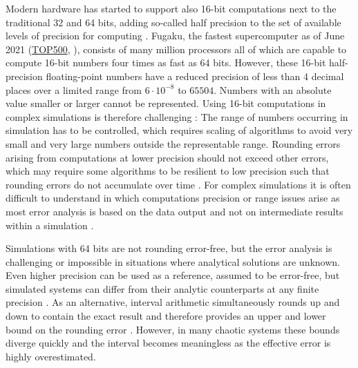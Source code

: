 Modern hardware has started to support also 16-bit computations next to the traditional 32 and 64 bits,
adding so-called half precision to the set of available levels of precision for computing \citep{Jouppi2018,Odajima2020}.
Fugaku, the fastest supercomputer as of June 2021 (\href{https://top500.org}{TOP500}, \cite{Dongarra2011}), consists
of many million processors all of which are capable to compute 16-bit numbers four times as fast as 64 bits. However, these 
16-bit half-precision floating-point numbers have a reduced precision of less than 4 decimal places over a limited range from
$6 \cdot 10^{-8}$ to $65504$. Numbers with an absolute value smaller or larger cannot be represented. Using 16-bit computations in 
complex simulations is therefore challenging \citep{Klower2020a}: The range of numbers occurring in simulation has to be controlled,
which requires scaling of algorithms to avoid very small and very large numbers outside the representable range.
Rounding errors arising from computations at lower precision should not exceed other errors, which may require
some algorithms to be resilient to low precision such that rounding errors do not accumulate over time \citep{Higham2002}.
For complex simulations it is often difficult to understand in which computations precision or range issues arise
as most error analysis is based on the data output and not on intermediate results within a simulation \citep{Fevotte2019,Jezequel2008}.

Simulations with 64 bits are not rounding error-free, but the error analysis is challenging or impossible in
situations where analytical solutions are unknown. Even higher precision can be used as a reference, assumed to be
error-free, but simulated systems can differ from their analytic counterparts at any finite precision \citep{Boghosian2019}.
As an alternative, interval arithmetic simultaneously rounds up and down to contain the exact result and therefore provides
an upper and lower bound on the rounding error \citep{Gustafson2015}. However, in many chaotic systems these bounds
diverge quickly and the interval becomes meaningless as the effective error is highly overestimated.

